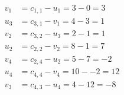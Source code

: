 \[
\begin{aligned}
v_{1} &= c_{1,1} - u_{1} = 3 - 0 = 3 \\
u_{3} &= c_{3,1} - v_{1} = 4 - 3 = 1 \\
v_{2} &= c_{3,2} - u_{3} = 2 - 1 = 1 \\
u_{2} &= c_{2,2} - v_{2} = 8 - 1 = 7 \\
v_{4} &= c_{2,4} - u_{2} = 5 - 7 = -2 \\
u_{4} &= c_{4,4} - v_{4} = 10 - -2 = 12 \\
v_{3} &= c_{4,3} - u_{4} = 4 - 12 = -8 \\
\end{aligned}
\]

